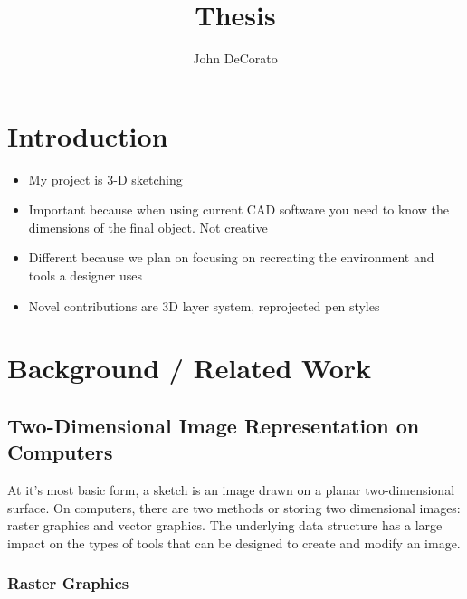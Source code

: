 \documentclass[12pt]{report}
\title{Thesis}
\author{John DeCorato}
\date{ }
\begin{document}
 
\maketitle
 
\tableofcontents

\pagebreak
\chapter{Introduction}

\begin{itemize}
	\item My project is 3-D sketching
	\item Important because when using current CAD software you need to know the dimensions of the final object. Not creative
	\item Different because we plan on focusing on recreating the environment and tools a designer uses
	\item Novel contributions are 3D layer system, reprojected pen styles 
\end{itemize}

\pagebreak
\chapter{Background / Related Work}

\section{Two-Dimensional Image Representation on Computers}

At it's most basic form, a sketch is an image drawn on a planar two-dimensional surface.
On computers, there are two methods or storing two dimensional images: raster graphics and vector graphics.
The underlying data structure has a large impact on the types of tools that can be designed to create and modify an image.

\subsection{Raster Graphics}
\end{document}
